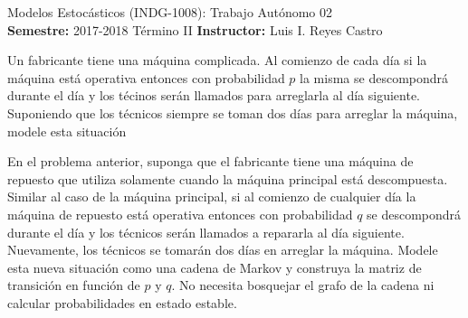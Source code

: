\documentclass[ a4paper, twoside, 11pt]{article}
\newcommand{\numero}{02}
\begin{document}
\allowdisplaybreaks



\begin{center}
\Large Modelos Estoc\'asticos (INDG-1008): Trabajo Aut\'onomo \numero \\[1ex]
\small \textbf{Semestre:} 2017-2018 T\'ermino II \qquad
\textbf{Instructor:} Luis I. Reyes Castro
\end{center}
\fullskip

%
\halfskip

\begin{problem}
Un fabricante tiene una m\'aquina complicada. Al comienzo de cada d\'ia si la m\'aquina est\'a operativa entonces con probabilidad $p$ la misma se descompondr\'a durante el d\'ia y los t\'ecinos ser\'an llamados para arreglarla al d\'ia siguiente. Suponiendo que los t\'ecnicos siempre se toman dos d\'ias para arreglar la m\'aquina, modele esta situaci\'on

En el problema anterior, suponga que el fabricante tiene una m\'aquina de repuesto que utiliza solamente cuando la m\'aquina principal est\'a descompuesta. Similar al caso de la m\'aquina principal, si al comienzo de cualquier d\'ia la m\'aquina de repuesto est\'a operativa entonces con probabilidad $q$ se descompondr\'a durante el d\'ia y los t\'ecnicos ser\'an llamados a repararla al d\'ia siguiente. Nuevamente, los t\'ecnicos se tomar\'an dos d\'ias en arreglar la m\'aquina. Modele esta nueva situaci\'on como una cadena de Markov y construya la matriz de transici\'on en funci\'on de $p$ y $q$. No necesita bosquejar el grafo de la cadena ni calcular probabilidades en estado estable. 

\end{problem}
\vspace{\baselineskip}

\begin{problem}

\end{problem}
\vspace{\baselineskip}

\begin{problem}

\end{problem}
\vspace{\baselineskip}
\end{document}
